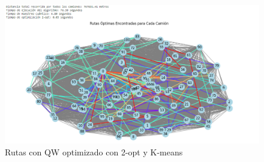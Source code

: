 \documentclass[11pt,a4paper,spanish]{book}
\begin{document}
\begin{figure}[h]
    \centering
    \includegraphics[width=1.1\linewidth]{solucionQW2opt.png}
    \caption{Rutas con QW optimizado con 2-opt y K-means}
    \label{fig:enter-label}
\end{figure}
\end{document}
